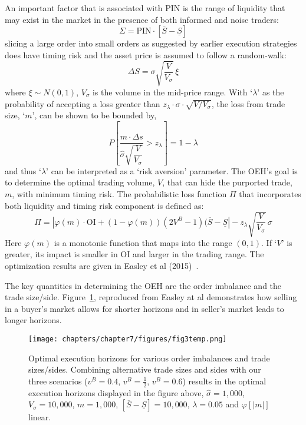 An important factor that is associated with PIN is the range of liquidity that may exist in the market in the presence of both informed and noise traders:
	\begin{equation}\label{eqn:newsigma}
	\Sigma = \text{PIN} \cdot [\overline{S} - \underline{S}]
	\end{equation}
slicing a large order into small orders as suggested by earlier execution strategies does have timing risk and the asset price is assumed to follow a random-walk:
	\begin{equation}\label{eqn:randomwalk}
	\Delta S=\sigma \sqrt{\dfrac{V}{V_\sigma}} \, \xi
	\end{equation}
where $\xi \sim N(0,1)$, $V_\sigma$ is the volume in the mid-price range. With `$\lambda$' as the probability of accepting a loss greater than $z_\lambda \cdot \sigma \cdot \sqrt{V/V_\sigma}$, the loss from trade size, `$m$', can be shown to be bounded by,
	\begin{equation}\label{eqn:bigbracp}
	P \left[ \dfrac{m \cdot \Delta s}{\hat{\sigma} \sqrt{\dfrac{V}{V_\sigma}}} > z_\lambda \right] = 1-\lambda
	\end{equation}
and thus `$\lambda$' can be interpreted as a `risk aversion' parameter. The OEH's goal is to determine the optimal trading volume, $V$, that can hide the purported trade, $m$, with minimum timing risk. The probabilistic loss function $\Pi$ that incorporates both liquidity and timing risk component is defined as:
	\begin{equation}\label{eqn:pi}
	\Pi = \left| \varphi(m) \cdot \text{OI} + (1-\varphi(m)) (2V^B-1)(\overline{S}-\underline{S}\right| - z_\lambda \sqrt{\dfrac{V}{V_\sigma}} \, \sigma
	\end{equation}
Here $\varphi(m)$ is a monotonic function that maps into the range $(0,1)$. If `$V$' is greater, its impact is smaller in OI and larger in the trading range. The optimization results are given in Easley et al (2015)~\cite{prado2}.


The key quantities in determining the OEH are the order imbalance and the trade size/side. Figure~\ref{fig:3temp}, reproduced from Easley at al demonstrates how selling in a buyer's market allows for shorter horizons and in seller's market leads to longer horizons.  


\begin{figure}[!ht]
   \centering
    \texttt{[image: chapters/chapter7/figures/fig3temp.png]}
     \caption{Optimal execution horizons for various order imbalances and trade sizes/sides. Combining alternative trade sizes and sides with our three scenarios ($v^B=0.4$, $v^B=\frac{1}{2}$, $v^B=0.6$) results in the optimal execution horizons displayed in the figure above, $\hat{\sigma}=1,000$, $V_\sigma=10,000$, $m=1,000$, $[\overline{S}-\underline{S}]=10,000$, $\lambda=0.05$ and $\varphi[|m|]$ linear. \label{fig:3temp}}
\end{figure}


